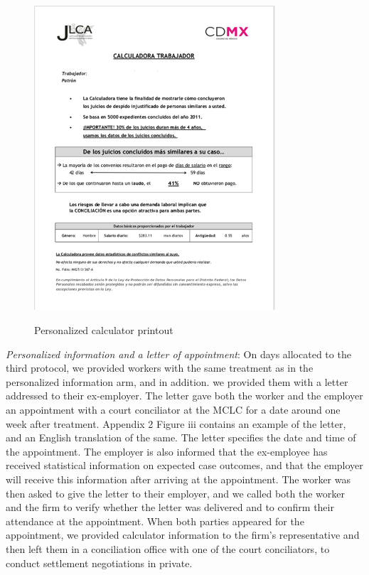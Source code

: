 \documentclass[12 pt]{article}
\begin{document}
\begin{figure}[!htbp] %
    \centering
    \caption{Personalized calculator printout}
    \includegraphics[width=0.8\textwidth]{Figures/Figure2.png}
    \label{fig:2}
\end{figure}

\emph{Personalized information and a letter of appointment}: On days allocated to the third protocol, we provided workers with the same treatment as in the personalized information arm, and in addition. we provided them with a letter addressed to their ex-employer. The letter gave both the worker and the employer an appointment with a court conciliator at the MCLC for a date around one week after treatment. Appendix 2 Figure iii contains an example of the letter, and an English translation of the same. The letter specifies the date and time of the appointment. The employer is also informed that the ex-employee has received statistical information on expected case outcomes, and that the employer will receive this information after arriving at the appointment. The worker was then asked to give the letter to their employer, and we called both the worker and the firm to verify whether the letter was delivered and to confirm their attendance at the appointment. When both parties appeared for the appointment, we provided calculator information to the firm’s representative and then left them in a conciliation office with one of the court conciliators, to conduct settlement negotiations in private. 
\end{document}
